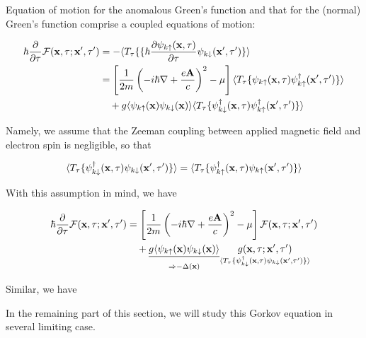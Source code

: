 Equation of motion for the anomalous Green's function and that for the (normal) Green's function comprise a  coupled equations of motion:

\[\begin{split}
\hbar\frac{\partial}{\partial\tau}\mathcal{F}({\bf x},\tau;{\bf x'},\tau') &= -\langle T_\tau\{\{\hbar\frac{\partial\psi_{k\uparrow}({\bf x},\tau)}{\partial\tau}\psi_{k\downarrow}({\bf x'},\tau')\}\rangle\\
&= \left[\frac{1}{2m}\left(-i\hbar\nabla+\frac{e{\bf A}}{c}\right)^2-\mu\right]\langle T_\tau \{\psi_{k\uparrow}({\bf x},\tau)\psi^\dagger_{k\uparrow}({\bf x'},\tau')\}\rangle\\
&\quad + g\langle\psi_{k\uparrow}({\bf x})\psi_{k\downarrow}({\bf x})\rangle\langle T_\tau \{\psi^\dagger_{k\downarrow}({\bf x},\tau)\psi^\dagger_{k\uparrow}({\bf x'},\tau')\}\rangle
\end{split}\]

Namely, we assume that the Zeeman coupling between applied magnetic field and electron spin is negligible, so that

\[\langle T_\tau\{\psi_{k\downarrow}^\dagger({\bf x},\tau)\psi_{k\downarrow}({\bf x'},\tau')\}\rangle = \langle T_\tau\{\psi_{k\uparrow}^\dagger({\bf x},\tau)\psi_{k\uparrow}({\bf x'},\tau')\}\rangle  \]

With this assumption in mind, we have

\[\begin{split}
\hbar\frac{\partial}{\partial\tau}\mathcal{F}({\bf x},\tau;{\bf x'},\tau') 
&= \left[\frac{1}{2m}\left(-i\hbar\nabla+\frac{e{\bf A}}{c}\right)^2-\mu\right]\mathcal{F}({\bf x},\tau;{\bf x'},\tau') \\
&\quad + \underset{\Rightarrow-\Delta({\bf x})}{\sout{g\langle\psi_{k\uparrow}({\bf x})\psi_{k\downarrow}({\bf x})\rangle}} \underset{\langle T_\tau\{\psi_{k\downarrow}^\dagger({\bf x},\tau)\psi_{k\downarrow}({\bf x'},\tau')\}\rangle}{\quad g({\bf x},\tau;{\bf x'},\tau') \quad}
\end{split}\]

Similar, we have



In the remaining part of this section, we will study this Gorkov equation in several limiting case.

